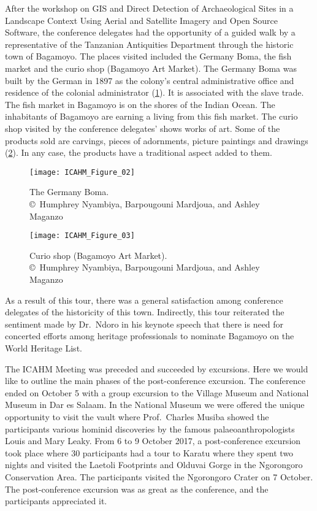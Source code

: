 
After the workshop on GIS and Direct Detection of Archaeological Sites in a Landscape Context Using Aerial and Satellite Imagery and Open Source Software, the conference delegates had the opportunity of a guided walk by a representative of the Tanzanian Antiquities Department through the historic town of Bagamoyo. The places visited included the Germany Boma, the fish market and the curio shop (Bagamoyo Art Market). The Germany Boma was built by the German in 1897 as the colony’s central administrative office and residence of the colonial administrator (\cref{fig:ICAHM_Figure_02}). It is associated with the slave trade. The fish market in Bagamoyo is on the shores of the Indian Ocean. The inhabitants of Bagamoyo are earning a living from this fish market. The curio shop visited by the conference delegates’ shows works of art. Some of the products sold are carvings, pieces of adornments, picture paintings and drawings (\cref{fig:ICAHM_Figure_03}). In any case, the products have a traditional aspect added to them.

\begin{figure}[!tb]
	\texttt{[image: ICAHM\_Figure\_02]}
	\caption{The Germany Boma.
		{\normalfont\scriptsize \\ \copyright\
			Humphrey Nyambiya, Barpougouni Mardjoua, and Ashley Maganzo %
	}}
	\label{fig:ICAHM_Figure_02}
\end{figure}

\begin{figure}[!tb]
	\texttt{[image: ICAHM\_Figure\_03]}
	\caption{Curio shop (Bagamoyo Art Market).
		{\normalfont\scriptsize \\ \copyright\
			Humphrey Nyambiya, Barpougouni Mardjoua, and Ashley Maganzo %
	}}
	\label{fig:ICAHM_Figure_03}
\end{figure}

As a result of this tour, there was a general satisfaction among conference delegates of the historicity of this town. Indirectly, this tour reiterated the sentiment made by Dr.~Ndoro in his keynote speech that there is need for concerted efforts among heritage professionals to nominate Bagamoyo on the World Heritage List.

The ICAHM Meeting was preceded and succeeded by excursions. Here we would like to outline the main phases of the post-conference excursion. The conference ended on October 5 with a group excursion to the Village Museum and National Museum in Dar es Salaam. In the National Museum we were offered the unique opportunity to visit the vault where Prof.~Charles Musiba showed the participants various hominid discoveries by the famous palaeoanthropologists Louis and Mary Leaky.  From 6 to 9 October 2017, a post-conference excursion took place where 30 participants had a tour to Karatu where they spent two nights and visited the Laetoli Footprints and Olduvai Gorge in the Ngorongoro Conservation Area. The participants visited the Ngorongoro Crater on 7 October. The post-conference excursion was as great as the conference, and the participants appreciated it.

